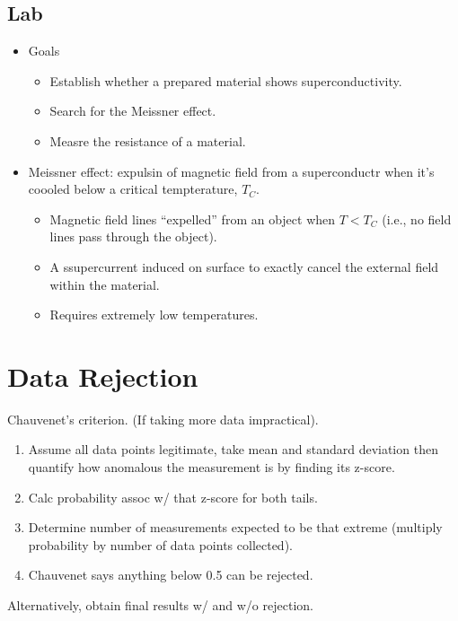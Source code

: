 \documentclass[twocolumn]{article}
\begin{document}
\subsection{Lab}
\begin{itemize}
    \item Goals
    \begin{itemize}
        \item Establish whether a prepared material shows superconductivity.
        \item Search for the Meissner effect.
        \item Measre the resistance of a material.
    \end{itemize}
    \item Meissner effect: expulsin of magnetic field from a superconductr when it's coooled below a critical tempterature, $T_C$.
    \begin{itemize}
        \item Magnetic field lines ``expelled'' from an object when $T < T_C$ (i.e., no field lines pass through the object).
        \item A ssupercurrent induced on surface to exactly cancel the external field within the material.
        \item Requires extremely low temperatures.
    \end{itemize}
\end{itemize}

\section{Data Rejection}
Chauvenet's criterion. (If taking more data impractical).
\begin{enumerate}
    \item Assume all data points legitimate, take mean and standard deviation then quantify how anomalous the measurement is by finding its z-score.
    \item Calc probability assoc w/ that z-score for both tails.
    \item Determine number of measurements expected to be that extreme (multiply probability by number of data points collected).
    \item Chauvenet says anything below 0.5 can be rejected.
\end{enumerate}
Alternatively, obtain final results w/ and w/o rejection.


\cleardoublepage
\end{document}

